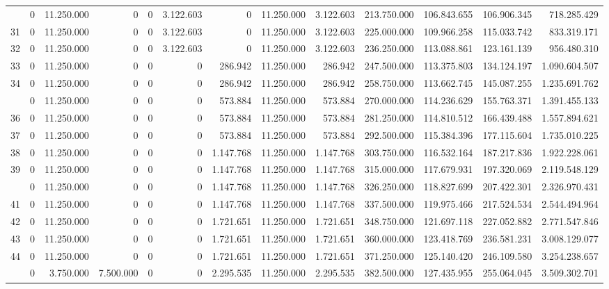 \documentclass[
  10pt,
  a4paper]{article}
\begin{document}
\begin{landscape}
\begin{longtable}[t]{rrrrrrrrrrrrr}
\addlinespace
30 & 0 & 11.250.000 & 0 & 0 & 3.122.603 & 0 & 11.250.000 & 3.122.603 & 213.750.000 & 106.843.655 & 106.906.345 & 718.285.429\\
31 & 0 & 11.250.000 & 0 & 0 & 3.122.603 & 0 & 11.250.000 & 3.122.603 & 225.000.000 & 109.966.258 & 115.033.742 & 833.319.171\\
32 & 0 & 11.250.000 & 0 & 0 & 3.122.603 & 0 & 11.250.000 & 3.122.603 & 236.250.000 & 113.088.861 & 123.161.139 & 956.480.310\\
33 & 0 & 11.250.000 & 0 & 0 & 0 & 286.942 & 11.250.000 & 286.942 & 247.500.000 & 113.375.803 & 134.124.197 & 1.090.604.507\\
34 & 0 & 11.250.000 & 0 & 0 & 0 & 286.942 & 11.250.000 & 286.942 & 258.750.000 & 113.662.745 & 145.087.255 & 1.235.691.762\\
\addlinespace
35 & 0 & 11.250.000 & 0 & 0 & 0 & 573.884 & 11.250.000 & 573.884 & 270.000.000 & 114.236.629 & 155.763.371 & 1.391.455.133\\
36 & 0 & 11.250.000 & 0 & 0 & 0 & 573.884 & 11.250.000 & 573.884 & 281.250.000 & 114.810.512 & 166.439.488 & 1.557.894.621\\
37 & 0 & 11.250.000 & 0 & 0 & 0 & 573.884 & 11.250.000 & 573.884 & 292.500.000 & 115.384.396 & 177.115.604 & 1.735.010.225\\
38 & 0 & 11.250.000 & 0 & 0 & 0 & 1.147.768 & 11.250.000 & 1.147.768 & 303.750.000 & 116.532.164 & 187.217.836 & 1.922.228.061\\
39 & 0 & 11.250.000 & 0 & 0 & 0 & 1.147.768 & 11.250.000 & 1.147.768 & 315.000.000 & 117.679.931 & 197.320.069 & 2.119.548.129\\
\addlinespace
40 & 0 & 11.250.000 & 0 & 0 & 0 & 1.147.768 & 11.250.000 & 1.147.768 & 326.250.000 & 118.827.699 & 207.422.301 & 2.326.970.431\\
41 & 0 & 11.250.000 & 0 & 0 & 0 & 1.147.768 & 11.250.000 & 1.147.768 & 337.500.000 & 119.975.466 & 217.524.534 & 2.544.494.964\\
42 & 0 & 11.250.000 & 0 & 0 & 0 & 1.721.651 & 11.250.000 & 1.721.651 & 348.750.000 & 121.697.118 & 227.052.882 & 2.771.547.846\\
43 & 0 & 11.250.000 & 0 & 0 & 0 & 1.721.651 & 11.250.000 & 1.721.651 & 360.000.000 & 123.418.769 & 236.581.231 & 3.008.129.077\\
44 & 0 & 11.250.000 & 0 & 0 & 0 & 1.721.651 & 11.250.000 & 1.721.651 & 371.250.000 & 125.140.420 & 246.109.580 & 3.254.238.657\\
\addlinespace
45 & 0 & 3.750.000 & 7.500.000 & 0 & 0 & 2.295.535 & 11.250.000 & 2.295.535 & 382.500.000 & 127.435.955 & 255.064.045 & 3.509.302.701\\

\end{longtable}
\end{landscape}
\end{document}
